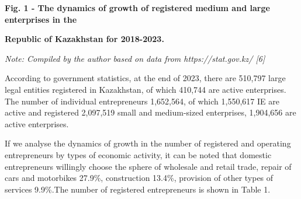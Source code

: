 {\bfseries Fig. 1 - The dynamics of growth of registered medium and large
enterprises in the}

{\bfseries Republic of Kazakhstan for 2018-2023.}

\emph{Note: Compiled by the author based on data from
https://stat.gov.kz/ {[}6{]}}

\begin{multicols}{2}
According to government statistics, at the end of 2023, there are
510,797 large legal entities registered in Kazakhstan, of which 410,744
are active enterprises. The number of individual entrepreneurs
1,652,564, of which 1,550,617 IE are active and registered 2,097,519
small and medium-sized enterprises, 1,904,656 are active enterprises.

If we analyse the dynamics of growth in the number of registered and
operating entrepreneurs by types of economic activity, it can be noted
that domestic entrepreneurs willingly choose the sphere of wholesale and
retail trade, repair of cars and motorbikes 27.9\%, construction 13.4\%,
provision of other types of services 9.9\%.The number of registered
entrepreneurs is shown in Table 1.
\end{multicols}


